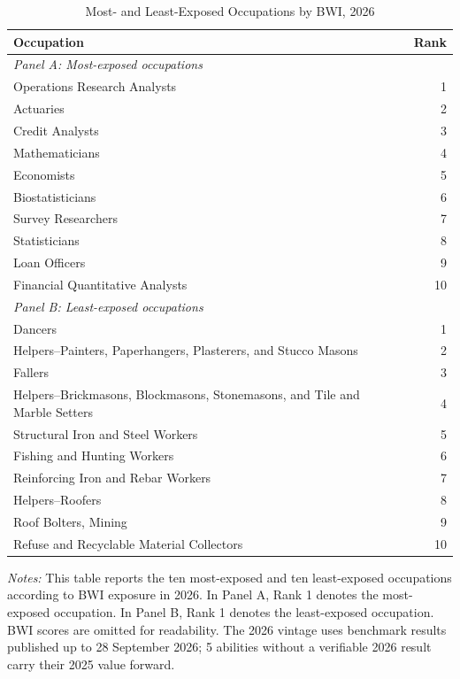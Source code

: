 \begin{table}[htbp]\centering
\caption{Most- and Least-Exposed Occupations by BWI, 2026}\label{tab:topbottom10}
\begin{tabular}{lr}\toprule
Occupation & Rank \\ \midrule
\multicolumn{2}{l}{\textit{Panel A: Most-exposed occupations}} \\
Operations Research Analysts & 1 \\
Actuaries & 2 \\
Credit Analysts & 3 \\
Mathematicians & 4 \\
Economists & 5 \\
Biostatisticians & 6 \\
Survey Researchers & 7 \\
Statisticians & 8 \\
Loan Officers & 9 \\
Financial Quantitative Analysts & 10 \\
\multicolumn{2}{l}{\textit{Panel B: Least-exposed occupations}} \\
Dancers & 1 \\
Helpers--Painters, Paperhangers, Plasterers, and Stucco Masons & 2 \\
Fallers & 3 \\
Helpers--Brickmasons, Blockmasons, Stonemasons, and Tile and Marble Setters & 4 \\
Structural Iron and Steel Workers & 5 \\
Fishing and Hunting Workers & 6 \\
Reinforcing Iron and Rebar Workers & 7 \\
Helpers--Roofers & 8 \\
Roof Bolters, Mining & 9 \\
Refuse and Recyclable Material Collectors & 10 \\
\bottomrule\end{tabular}
\begin{minipage}{0.95\linewidth}\footnotesize \textit{Notes:} This table reports the ten most-exposed and ten least-exposed occupations according to BWI exposure in 2026. In Panel A, Rank 1 denotes the most-exposed occupation. In Panel B, Rank 1 denotes the least-exposed occupation. BWI scores are omitted for readability. The 2026 vintage uses benchmark results published up to 28 September 2026; 5 abilities without a verifiable 2026 result carry their 2025 value forward.\end{minipage}
\end{table}
